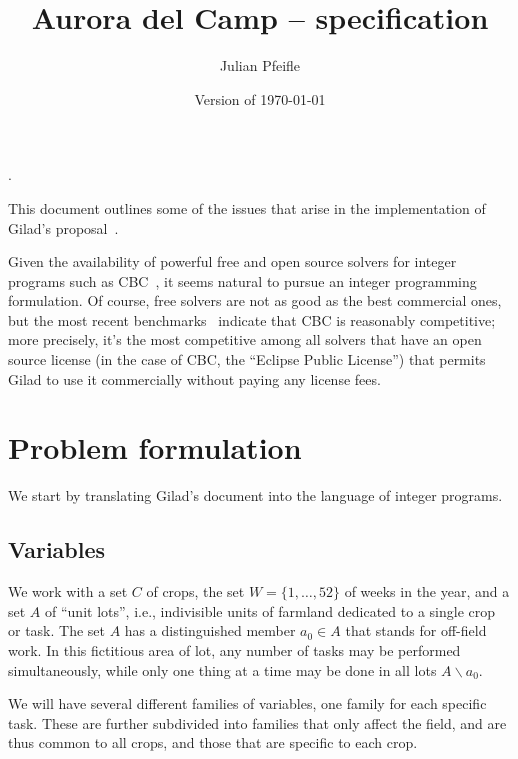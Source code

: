 \documentclass[11pt]{amsart}
\begin{document}
\renewcommand*\descriptionlabel[1]{%
\hspace\labelsep\normalfont\itshape #1:}.

\title{Aurora del Camp -- specification}
\author{Julian Pfeifle}
\date{Version of \today}
\maketitle

This document outlines some of the issues that arise in the
implementation of Gilad's proposal~\cite{buzi11}.

\medskip
Given the availability of powerful free and open source solvers for
integer programs such as CBC~\cite{cbc}, it seems natural to pursue an
integer programming formulation. Of course, free solvers are not as
good as the best commercial ones, but the most recent
benchmarks~\cite{mittelmann11} indicate that CBC is reasonably
competitive; more precisely, it's the most competitive among all
solvers that have an open source license (in the case of CBC, the
``Eclipse Public License'') that permits Gilad to use it commercially
without paying any license fees.

\section{Problem formulation}

We start by translating Gilad's document into the language of integer
programs. %
  
\subsection{Variables}

We work with a set $C$ of crops, the set $W=\{1,\dots,52\}$ of weeks
in the year, and a set $A$ of ``unit lots'', i.e., indivisible units
of farmland dedicated to a single crop or task. The set $A$ has a
distinguished member $a_0\in A$ that stands for off-field work. In
this fictitious area of lot, any number of tasks may be performed
simultaneously, while only one thing at a time may be done in all
lots $A\smallsetminus a_0$. 

We will have several different families of variables, one family for
each specific task. These are further subdivided into families that
only affect the field, and are thus common to all crops, and those
that are specific to each crop.
\end{document}
